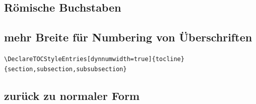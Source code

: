 \renewcommand{\thesubsection}{\thesection.\Roman{subsection}}

\subsection{Römische Buchstaben}

\subsection{mehr Breite für Numbering von Überschriften}
\verb|\DeclareTOCStyleEntries[dynnumwidth=true]{tocline}{section,subsection,subsubsection}|

\renewcommand{\thesubsection}{\thesection.\arabic{subsection}}
\subsection{zurück zu normaler Form}

